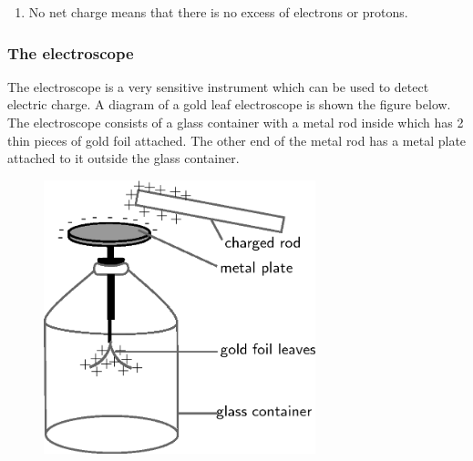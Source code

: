 {\begin{mdframed}[linewidth=4, leftmargin=40, rightmargin=40]
\begin{exercise}
\begin{enumerate}[noitemsep, label=\textbf{Step} \textbf{\arabic*}. ]
$\begin{array}{ccc}Q=\frac{{Q}_{1}+{Q}_{2}}{2}\\ \phantom{x}=\frac{9,6\ensuremath{\times}{10}^{-18}+\left(-9,6\ensuremath{\times}{10}^{-18}\right)}{2}\\ \phantom{x}=0\phantom{\rule{2pt}{0ex}}\mathrm{C}\end{array}$.\newline
     So each sphere is now neutral. \item \newline
    No net charge means that there is no excess of electrons or protons.\end{enumerate}
    \end{exercise}
    \end{mdframed}
    }
    \noindent
  \label{m38781*uid11}
            \subsubsection{ The electroscope}
            \nopagebreak
        \label{m38781*id201715}The electroscope is a very sensitive instrument which can be used to detect electric charge.
A diagram of a gold leaf electroscope is shown the figure below. The electroscope consists of a glass container
with a metal rod inside which has 2 thin pieces of gold foil attached. The other end of the metal rod has a metal plate attached to it outside the glass container.\par 
        \label{m38781*id200543}
    \setcounter{subfigure}{0}
	\begin{figure}[H] %
    \begin{center}
    \label{m38781*id200546!!!underscore!!!media}\label{m38781*id200546!!!underscore!!!printimage}\includegraphics[height=300px]{col11305.imgs/m38781_PG10C8_009.png} %
      \vspace{2pt}
    \vspace{.1in}
    \end{center}
 \end{figure}       
